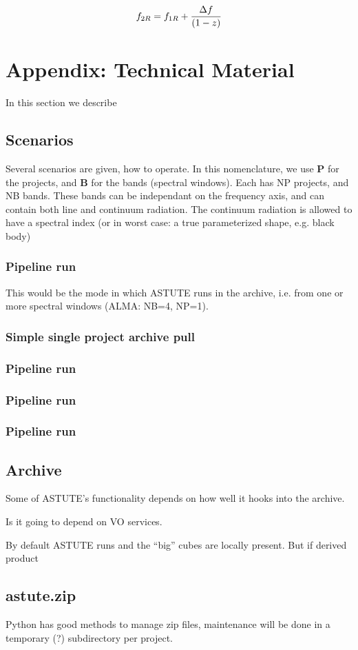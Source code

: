 \documentclass[preprint]{aastex} %
\begin{document}
$$
 f_{2R} = f_{1R} + {  {\Delta f} \over { (1-z) }}
$$

\section*{Appendix: Technical Material}

In this section we describe

\subsection{Scenarios}

Several scenarios are given, how to operate.  In this nomenclature, we use {\bf P} for
the projects, and {\bf B} for the bands (spectral windows). Each has NP projects, and 
NB bands. These bands can be independant on the frequency axis, and can contain
both line and continuum radiation. The continuum radiation is allowed to have a spectral
index (or in worst case: a true parameterized shape, e.g. black body)

\subsubsection{Pipeline run}

This would be the mode in which ASTUTE runs in the archive, i.e. from one or more spectral
windows (ALMA: NB=4, NP=1). 

\subsubsection{Simple single project archive pull}

\subsubsection{Pipeline run}

\subsubsection{Pipeline run}

\subsubsection{Pipeline run}



\subsection{Archive}

Some of ASTUTE's functionality depends on how well it hooks into the archive.

Is it going to depend on VO services.

By default ASTUTE runs and the ``big'' cubes are locally present. But if derived
product

\subsection{astute.zip}

Python has good methods to manage zip files, maintenance will be done in 
a temporary (?) subdirectory per project.
\end{document}

